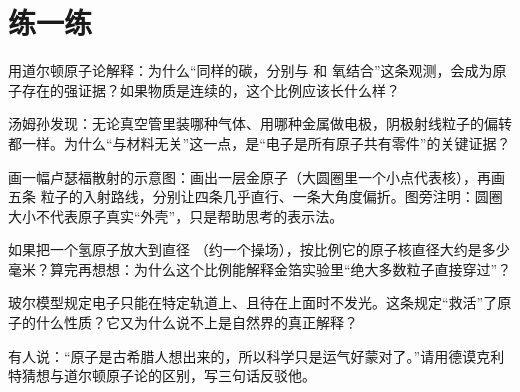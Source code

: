 \section*{练一练}

\begin{sikaoti}
\item 用道尔顿原子论解释：为什么“同样的碳，分别与  和  氧结合”这条观测，会成为原子存在的强证据？如果物质是连续的，这个比例应该长什么样？
\item 汤姆孙发现：无论真空管里装哪种气体、用哪种金属做电极，阴极射线粒子的偏转都一样。为什么“与材料无关”这一点，是“电子是所有原子共有零件”的关键证据？
\item 画一幅卢瑟福散射的示意图：画出一层金原子（大圆圈里一个小点代表核），再画五条 \chem{\alpha} 粒子的入射路线，分别让四条几乎直行、一条大角度偏折。图旁注明：圆圈大小不代表原子真实“外壳”，只是帮助思考的表示法。
\item 如果把一个氢原子放大到直径 （约一个操场），按比例它的原子核直径大约是多少毫米？算完再想想：为什么这个比例能解释金箔实验里“绝大多数粒子直接穿过”？
\item 玻尔模型规定电子只能在特定轨道上、且待在上面时不发光。这条规定“救活”了原子的什么性质？它又为什么说不上是自然界的真正解释？
\item 有人说：“原子是古希腊人想出来的，所以科学只是运气好蒙对了。”请用德谟克利特猜想与道尔顿原子论的区别，写三句话反驳他。
\end{sikaoti}
